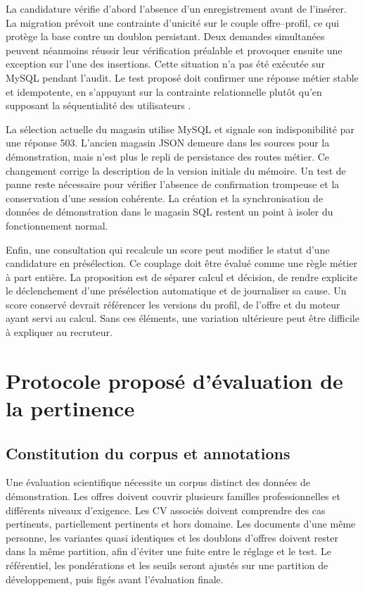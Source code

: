 La candidature vérifie d'abord l'absence d'un enregistrement avant de l'insérer. La migration prévoit une contrainte d'unicité sur le couple offre--profil, ce qui protège la base contre un doublon persistant. Deux demandes simultanées peuvent néanmoins réussir leur vérification préalable et provoquer ensuite une exception sur l'une des insertions. Cette situation n'a pas été exécutée sur MySQL pendant l'audit. Le test proposé doit confirmer une réponse métier stable et idempotente, en s'appuyant sur la contrainte relationnelle plutôt qu'en supposant la séquentialité des utilisateurs \cite{mysql-constraints}.

La sélection actuelle du magasin utilise MySQL et signale son indisponibilité par une réponse 503. L'ancien magasin JSON demeure dans les sources pour la démonstration, mais n'est plus le repli de persistance des routes métier. Ce changement corrige la description de la version initiale du mémoire. Un test de panne reste nécessaire pour vérifier l'absence de confirmation trompeuse et la conservation d'une session cohérente. La création et la synchronisation de données de démonstration dans le magasin SQL restent un point à isoler du fonctionnement normal.

Enfin, une consultation qui recalcule un score peut modifier le statut d'une candidature en présélection. Ce couplage doit être évalué comme une règle métier à part entière. La proposition est de séparer calcul et décision, de rendre explicite le déclenchement d'une présélection automatique et de journaliser sa cause. Un score conservé devrait référencer les versions du profil, de l'offre et du moteur ayant servi au calcul. Sans ces éléments, une variation ultérieure peut être difficile à expliquer au recruteur.

\section{Protocole proposé d'évaluation de la pertinence}

\subsection{Constitution du corpus et annotations}

Une évaluation scientifique nécessite un corpus distinct des données de démonstration. Les offres doivent couvrir plusieurs familles professionnelles et différents niveaux d'exigence. Les CV associés doivent comprendre des cas pertinents, partiellement pertinents et hors domaine. Les documents d'une même personne, les variantes quasi identiques et les doublons d'offres doivent rester dans la même partition, afin d'éviter une fuite entre le réglage et le test. Le référentiel, les pondérations et les seuils seront ajustés sur une partition de développement, puis figés avant l'évaluation finale.

